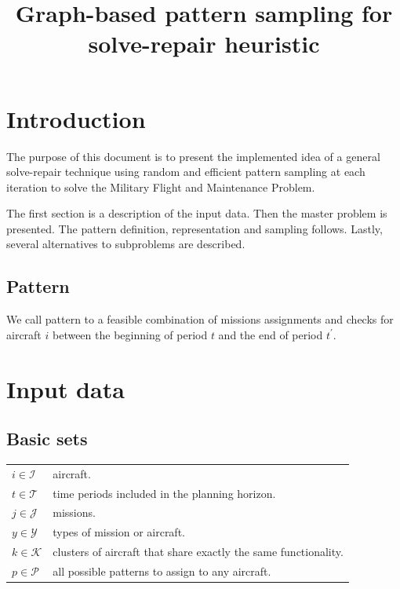 \documentclass[a4paper,11pt]{article}
\title{Graph-based pattern sampling for solve-repair heuristic}
\author{}
\begin{document}
\maketitle

\section{Introduction}
  \label{sec:model}

  The purpose of this document is to present the implemented idea of a general solve-repair technique using random and efficient pattern sampling at each iteration to solve the Military Flight and Maintenance Problem.

  The first section is a description of the input data. Then the master problem is presented. The pattern definition, representation and sampling follows. Lastly, several alternatives to subproblems are described.

\subsection{Pattern}

  We call pattern to a feasible combination of missions assignments and checks for aircraft $i$ between the beginning of period $t$ and the end of period $t^\prime$.

\section{Input data}

    \subsection{Basic sets}

        \begin{tabular}{p{15mm}p{140mm}}
            $i \in \mathcal{I}$     &  aircraft. \\
            $t \in \mathcal{T}$     &  time periods included in the planning horizon. \\
            $j \in \mathcal{J}$     &  missions. \\
            $y \in \mathcal{Y}$     &  types of mission or aircraft. \\
            $k \in \mathcal{K}$     &  clusters of aircraft that share exactly the same functionality. \\
            $p \in \mathcal{P}$     &  all possible patterns to assign to any aircraft. \\
        \end{tabular}
\end{document}
